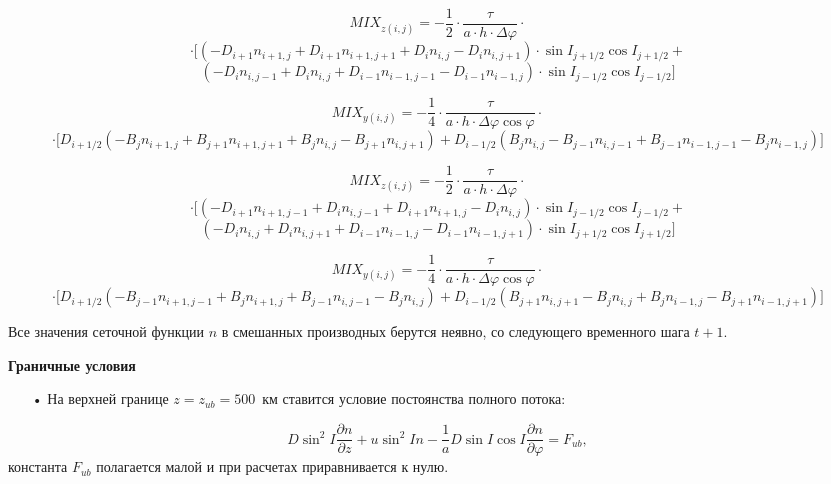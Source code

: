 \documentclass[2pt, a4paper, fleqn]{extarticle}
\let\geq\geqslant
\begin{document}
\begin{center}
\fbox{При $\sin I \geq 0$:}
\end{center}

$$MIX_{z(i, j)} = -\dfrac{1}{2}\cdot\dfrac{\tau}{a\cdot h\cdot \Delta\varphi}\cdot$$ 
$$\cdot\bigg[(-D_{i+1} n_{i+1, j} + D_{i+1}n_{i+1, j+1}+ D_i n_{i, j} - D_{i} n_{i, j+1})\cdot \sin I_{j+1/2}\cos I_{j+1/2} + $$
$$ (-D_i n_{i, j-1} + D_i n_{i, j} + D_{i-1} n_{i-1, j-1} - D_{i-1} n_{i-1, j})\cdot \sin I_{j-1/2}\cos I_{j-1/2}\bigg]$$

$$MIX_{y(i, j)} = -\dfrac{1}{4}\cdot\dfrac{\tau}{a\cdot h\cdot \Delta\varphi\cos\varphi}\cdot$$
$$\cdot\bigg[D_{i+1/2}(-B_j n_{i+1, j}+ B_{j+1} n_{i+1, j+1}+ B_{j}n_{i, j} - B_{j+1}n_{i, j+1}) +D_{i-1/2}(B_j n_{i, j} - B_{j-1}n_{i, j-1} + B_{j-1}n_{i-1, j-1} - B_j n_{i-1, j})\bigg]$$


\begin{center}
\end{center}

$$MIX_{z(i, j)} = -\dfrac{1}{2}\cdot\dfrac{\tau}{a\cdot h\cdot \Delta\varphi}\cdot$$ 
$$\cdot\bigg[(-D_{i+1} n_{i+1, j-1} + D_{i}n_{i, j-1}+ D_{i+1} n_{i+1, j} - D_{i} n_{i, j})\cdot \sin I_{j-1/2}\cos I_{j-1/2} + $$
$$ (-D_i n_{i, j} + D_i n_{i, j+1} + D_{i-1} n_{i-1, j} - D_{i-1} n_{i-1, j+1})\cdot \sin I_{j+1/2}\cos I_{j+1/2}\bigg]$$

$$MIX_{y(i, j)} = -\dfrac{1}{4}\cdot\dfrac{\tau}{a\cdot h\cdot \Delta\varphi\cos\varphi}\cdot$$
$$\cdot\bigg[D_{i+1/2}(-B_{j-1} n_{i+1, j-1}+ B_{j} n_{i+1, j}+ B_{j-1}n_{i, j-1} - B_{j}n_{i, j}) +D_{i-1/2}(B_{j+1} n_{i, j+1} - B_{j}n_{i, j} + B_{j}n_{i-1, j} - B_{j+1} n_{i-1, j+1})\bigg]$$


Все значения сеточной функции $n$ в смешанных производных берутся неявно, со следующего временного шага $t+1$.

\bigskip

\begin{center}
{\bf\Large Граничные условия}
\end{center}
\begin{itemize}
\item[•] На верхней границе $z = z_{ub} = 500$~км ставится условие постоянства полного потока:
\end{itemize}
 $$D\sin^2 I\dfrac{\partial n}{\partial z} + u\sin^2 I n - \dfrac{1}{a}D\sin I \cos I \dfrac{\partial n}{\partial \varphi} = F_{ub},$$ константа $F_{ub}$ полагается малой и при расчетах приравнивается к нулю.
\end{document}
